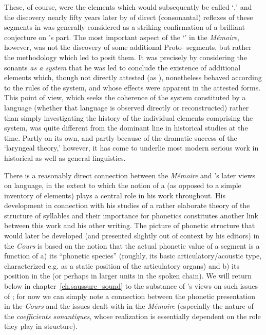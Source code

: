 These, of course, were the elements which would subsequently be called
`,' and the discovery nearly fifty years later by
\citet{kurylowicz27:hittite} of direct (consonantal) reflexes of these segments in
 was generally considered as a striking confirmation of a
brilliant conjecture on {\Saussure}'s part.  The most important aspect of
the `' in the \textsl{Mémoire}, however, was not the
discovery of some additional Proto- segments, but rather
the methodology which led {\Saussure} to posit them.  It was precisely by
considering the  sonants \emph{as a system} that he
was led to conclude the existence of additional elements which, though
not directly attested (as ), nonetheless behaved according
to the {rules} of the system, and whose effects were apparent in the
attested forms. This point of view, which seeks the coherence of the
system constituted by a language (whether that language is observed
directly or reconstructed) rather than simply investigating the
history of the individual elements comprising the system, was quite
different from the dominant line in historical studies at the time.
Partly on its own, and partly because of the dramatic success of the
`laryngeal theory,' however, it has come to underlie most modern
serious work in historical as well as general linguistics.

There is a reasonably direct connection between the \textsl{Mémoire}
and {\Saussure}'s later views on language, in the extent to which the
notion of a  (as opposed to a simple inventory of
elements) plays a central role in his work throughout.  His
development in connection with his  studies of a rather
elaborate theory of the structure of syllables and their importance
for phonetics constitutes another link between this work and his other
writing. The picture of phonetic structure that would later be
developed (and presented slightly out of context by his editors) in
the \textsl{Cours} is based on the notion that the actual phonetic
value of a segment is a function of a) its ``phonetic species''
(roughly, its basic articulatory/acoustic type, characterized e.g. as
a static position of the articulatory organs) and b) its position in
the  (or perhaps in larger units in the spoken chain).  We
will return below in chapter~\ref{ch.saussure_sound} to the substance
of {\Saussure}'s views on such issues of ; for now we can
simply note a connection between the phonetic presentation in the
\textsl{Cours} and the issues dealt with in the \textsl{Mémoire}
(especially the nature of the \emph{coefficients sonantiques}, whose
realization is essentially dependent on the role they play in 
structure).

